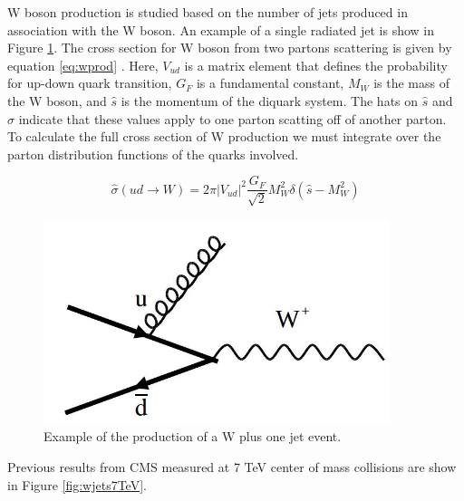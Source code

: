 \documentclass[oneside, letterpaper, oldfontcommands]{memoir}
\begin{document}
\qquad W boson production is studied based on the number of jets produced in association with the W boson. An example of a single radiated jet is show in Figure \ref{fig:WOneJet}. The cross section for W boson from two partons scattering is given by equation \ref{eq:wprod} \cite{Barger:0201058766}. Here, $V_{ud}$ is a matrix element that defines the probability for up-down quark transition, $G_{F}$ is a fundamental constant, $M_{W}$ is the mass of the W boson, and $\hat{s}$ is the momentum of the diquark system. The hats on $\hat{s}$ and $\hat{\sigma}$ indicate that these values apply to one parton scatting off of another parton. To calculate the full cross section of W production we must integrate over the parton distribution functions of the quarks involved.

\begin{equation} \label{eq:wprod}
\hat{\sigma}(u d \rightarrow W) = 2\pi |V_{ud}|^{2}\frac{G_{F}}{\sqrt{2}}M_{W}^{2}\delta(\hat{s} - M_{W}^{2})
\end{equation}

\begin{figure}[here]
\includegraphics[width=0.9\textwidth]{WOneJet.jpg}
\caption{Example of the production of a W plus one jet event.}
\label{fig:WOneJet}
\end{figure}

Previous results from CMS measured at 7 TeV center of mass collisions\cite{Khachatryan:2014uva} are show in Figure \ref{fig:wjets7TeV}. 
\end{document}
